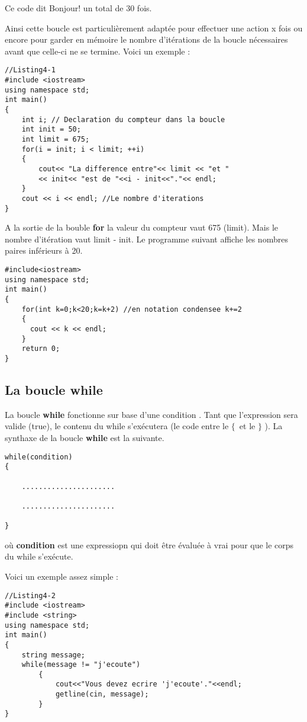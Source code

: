 \documentclass[a4paper, oneside,11pt]{book}
\begin{document}
Ce code dit Bonjour! un total de 30 fois. 

Ainsi cette boucle est particuli\`erement adapt\'ee pour effectuer une action x fois ou encore pour garder
en m\'emoire le nombre d'it\'erations de la boucle n\'ecessaires avant que celle-ci ne se termine. Voici un
exemple :

\begin{lstlisting}
//Listing4-1
#include <iostream>
using namespace std;
int main()
{
    int i; // Declaration du compteur dans la boucle
    int init = 50;
    int limit = 675;
    for(i = init; i < limit; ++i)
    {
        cout<< "La difference entre"<< limit << "et "
        << init<< "est de "<<i - init<<"."<< endl;
    }
    cout << i << endl; //Le nombre d'iterations
}
\end{lstlisting}

A la sortie de la bouble \textbf{for} la valeur du compteur vaut 675 (limit). Mais le nombre d'it\'eration vaut limit - init. Le programme suivant affiche les nombres paires
inf\'erieurs \`a 20.
\begin{lstlisting}
#include<iostream>
using namespace std;
int main()
{
    for(int k=0;k<20;k=k+2) //en notation condensee k+=2
    {
      cout << k << endl;
    }
    return 0;
}
\end{lstlisting}



\subsection{La boucle while}

La boucle \textbf{while} fonctionne sur base d'une condition . Tant que l'expression sera valide (true), le contenu du while s'ex\'ecutera (le code
entre le $\{$\ et le $\}$ ). La synthaxe de la boucle \textbf{while} est la suivante.


\begin{lstlisting}
while(condition)
{

    ......................
    
    ......................
    
}
\end{lstlisting}
o\`u \textbf{condition} est une expressiopn qui doit \^etre \'evalu\'ee \`a vrai pour que le corps du while s'ex\'ecute.

Voici un exemple assez simple :

\begin{lstlisting}
//Listing4-2
#include <iostream>
#include <string>
using namespace std;
int main()
{
    string message;
    while(message != "j'ecoute")
        {
            cout<<"Vous devez ecrire 'j'ecoute'."<<endl;
            getline(cin, message);
        }
}
\end{lstlisting}
\end{document}

